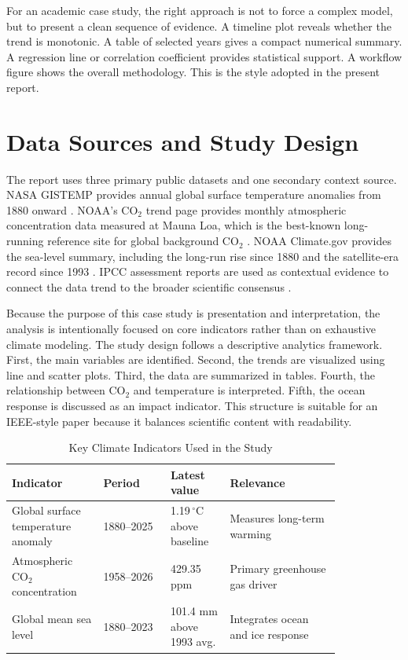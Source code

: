 \documentclass[conference]{IEEEtran}
\begin{document}
For an academic case study, the right approach is not to force a complex model, but to present a clean sequence of evidence. A timeline plot reveals whether the trend is monotonic. A table of selected years gives a compact numerical summary. A regression line or correlation coefficient provides statistical support. A workflow figure shows the overall methodology. This is the style adopted in the present report.

\section{Data Sources and Study Design}
The report uses three primary public datasets and one secondary context source. NASA GISTEMP provides annual global surface temperature anomalies from 1880 onward \cite{nasa_temp,nasa_worldofchange}. NOAA’s CO$_2$ trend page provides monthly atmospheric concentration data measured at Mauna Loa, which is the best-known long-running reference site for global background CO$_2$ \cite{noaa_co2}. NOAA Climate.gov provides the sea-level summary, including the long-run rise since 1880 and the satellite-era record since 1993 \cite{noaa_sea}. IPCC assessment reports are used as contextual evidence to connect the data trend to the broader scientific consensus \cite{ipcc_ar6}.

Because the purpose of this case study is presentation and interpretation, the analysis is intentionally focused on core indicators rather than on exhaustive climate modeling. The study design follows a descriptive analytics framework. First, the main variables are identified. Second, the trends are visualized using line and scatter plots. Third, the data are summarized in tables. Fourth, the relationship between CO$_2$ and temperature is interpreted. Fifth, the ocean response is discussed as an impact indicator. This structure is suitable for an IEEE-style paper because it balances scientific content with readability.

\begin{table}[t]
\caption{Key Climate Indicators Used in the Study}
\centering
\begin{tabular}{p{0.23\linewidth} p{0.17\linewidth} p{0.15\linewidth} p{0.28\linewidth}}
\toprule
Indicator & Period & Latest value & Relevance \\
\midrule
Global surface temperature anomaly & 1880--2025 & 1.19\,$^\circ$C above baseline & Measures long-term warming \\
Atmospheric CO$_2$ concentration & 1958--2026 & 429.35 ppm & Primary greenhouse gas driver \\
Global mean sea level & 1880--2023 & 101.4 mm above 1993 avg. & Integrates ocean and ice response \\
\bottomrule
\end{tabular}
\end{table}
\end{document}
